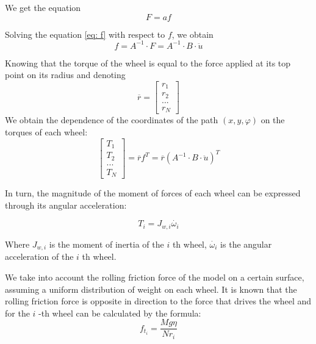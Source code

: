 \documentclass[oneside,final,14pt]{extreport}
\begin{document}
We get the equation
\begin{equation}
F = af
\label{eq: f}
\end{equation}

Solving the equation \ref{eq: f} with respect to $ f $, we obtain
\begin{equation}
f
=
A ^{- 1}
\cdot
F
=
A ^{- 1}
\cdot
B
\cdot
\ddot{u}
\end{equation}

Knowing that the torque of the wheel is equal to the force applied at its top point on its radius and denoting
\begin{equation}
\overline{r}
=
\begin{bmatrix}
r_{1} \\
r_{2} \\
... \\
r_{N}
\end{bmatrix}
\end{equation}
We obtain the dependence of the coordinates of the path $ (x, y, \varphi) $ on the torques of each wheel:
\begin{equation}
\label{eq: dynamic_w_friction}
\begin{bmatrix}
T_{1} \\
T_{2} \\
... \\
T_{N}
\end{bmatrix}
=
\overline{r}
f ^{T}
=
\overline{r}
(
A ^{- 1}
\cdot
B
\cdot
\ddot{u}
) ^{T}
\end{equation}

In turn, the magnitude of the moment of forces of each wheel can be expressed through its angular acceleration:

\begin{equation}
T_{i}
=
J_{w, i} \dot{\omega_{i}}
\end{equation}

Where $ J_{w, i} $ is the moment of inertia of the $ i $ th wheel, $ \dot{\omega_{i}} $ is the angular acceleration of the $ i $ th wheel.

We take into account the rolling friction force of the model on a certain surface, assuming a uniform distribution of weight on each wheel. It is known that the rolling friction force is opposite in direction to the force that drives the wheel and for the $ i $ -th wheel can be calculated by the formula:
\begin{equation}
f_{t_{i}}
=
\frac{Mg \eta}{Nr_{i}}
\end{equation}
\end{document}
